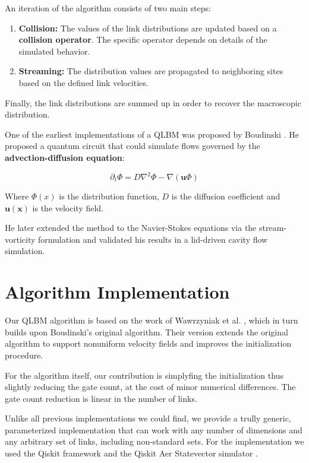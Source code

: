 \documentclass[pdflatex,sn-mathphys-num]{sn-jnl}%
\begin{document}
An iteration of the algorithm consists of two main steps:
\begin{enumerate}
    \item \textbf{Collision:} The values of the link distributions are updated based on a \textbf{collision operator}. The specific operator depends on details of the simulated behavior.
    \item \textbf{Streaming:} The distribution values are propagated to neighboring sites based on the defined link velocities.
\end{enumerate}

Finally, the link distributions are summed up in order to recover the macroscopic distribution.

One of the earliest implementations of a QLBM was proposed by Boudinski \cite{budinski2021quantum}.
He proposed a quantum circuit that could simulate flows governed by the \textbf{advection-diffusion equation}:

\begin{equation}
    \partial_t\Phi = D\nabla^{2}\Phi - \nabla(\mathbf{u}\Phi)
\end{equation}

Where $\Phi(x)$ is the distribution function, $D$ is the diffusion coefficient and $\mathbf{u(x)}$ is the velocity field.

He later extended the method to the Navier-Stokes equations \cite{ljubomir2022quantum} via the stream-vorticity formulation and validated his results in a lid-driven cavity flow simulation.

\section{Algorithm Implementation}
Our QLBM algorithm is based on the work of Wawrzyniak et al. \cite{wawrzyniak2025base}, which in turn builds upon Boudinski's original algorithm.
Their version extends the original algorithm to support nonuniform velocity fields and improves the initialization procedure.

For the algorithm itself, our contribution is simplyfing the initialization thus slightly reducing the gate count, at the cost of minor numerical differences. The gate count reduction is linear in the number of links.

Unlike all previous implementations we could find, we provide a trully generic, parameterized implementation that can work with any number of dimensions and any arbitrary set of links, including non-standard sets.
For the implementation we used the Qiskit framework and the Qiskit Aer Statevector simulator \cite{qiskit2024}.
\end{document}
